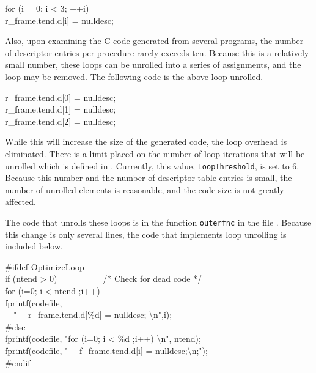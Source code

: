 \goodbreak
\begin{iconcode}
for (i = 0; i < 3; ++i)\\
\>r\_frame.tend.d[i] = nulldesc;\\
\end{iconcode}


Also, upon examining the C code generated from several programs, the
number of descriptor entries per procedure rarely exceeds ten. Because
this is a relatively small number, these loops can be unrolled into a
series of assignments, and the loop may be removed. The following code
is the above loop unrolled.

\goodbreak
\begin{iconcode}
r\_frame.tend.d[0] = nulldesc;\\
r\_frame.tend.d[1] = nulldesc;\\
r\_frame.tend.d[2] = nulldesc;\\
\end{iconcode}

While this will increase the size of the generated code, the loop
overhead is eliminated. There is a limit placed on the number of loop
iterations that will be unrolled which is defined in
. Currently, this value, \texttt{LoopThreshold}, is
set to 6. Because this number and the number of descriptor table
entries is small, the number of unrolled elements is reasonable, and
the code size is not greatly affected.


The code that unrolls these loops is in the function \texttt{outerfnc}
in the file . Because this change is only several
lines, the code that implements loop unrolling is included below.

\goodbreak
\begin{iconcode}
\#ifdef OptimizeLoop\\
\> if (ntend > 0) \ \ \ \ \ \ \ \ \ \ /* Check for dead code */\\
\> \>for (i=0; i < ntend ;i++)\\
\> \>\>fprintf(codefile,\\
\> \>\>\>\>\ \ " \ \ r\_frame.tend.d[\%d] = nulldesc; {\textbackslash}n",i);\\
\#else\\
\> fprintf(codefile, "for (i=0; i < \%d ;i++) {\textbackslash}n", ntend);\\
\> fprintf(codefile, " \ \ f\_frame.tend.d[i] = nulldesc;{\textbackslash}n;");\\
\#endif\\
\end{iconcode}

